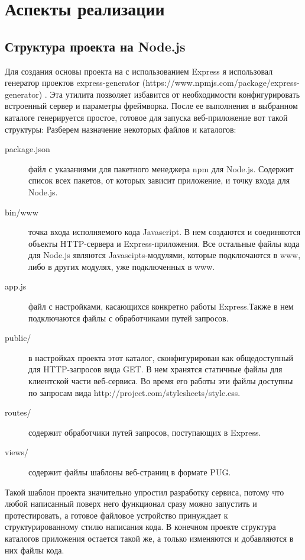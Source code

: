 \section{Аспекты реализации}
\subsection{Структура проекта на Node.js}
\label{subsec:project_structuture}
Для создания основы проекта на с использованием Express я использовал генератор проектов express-generator (https://www.npmjs.com/package/express-generator) . Эта утилита позволяет избавится от необходимости конфигурировать встроенный сервер и параметры фреймворка. После ее выполнения в выбранном каталоге генерируется простое, готовое для запуска  веб-приложение вот такой структуры:
 Разберем назначение некоторых файлов и каталогов:
 \begin{description}
 	\item[package.json] файл с указаниями для пакетного менеджера npm для Node.js. Содержит список всех пакетов, от которых зависит приложение, и точку входа для Node.js.  
 	\item[bin/www] точка входа исполняемого кода Javascript. В нем создаются и соединяются объекты HTTP-сервера и Express-приложения. Все остальные файлы кода для Node.js являются Javascipts-модулями, которые подключаются в www, либо в других модулях, уже подключенных в www.
 	\item[app.js] файл с настройками, касающихся конкретно работы Express.Также в нем подключаются файлы с обработчиками путей запросов.   
 	\item[public/] в настройках проекта этот каталог, сконфигурирован как общедоступный для  HTTP-запросов вида GET. В нем хранятся статичные файлы для клиентской части веб-сервиса. Во время его работы эти файлы доступны по запросам вида http://project.com/stylesheets/style.css.
 	\item[routes/]   содержит обработчики путей запросов, поступающих в Express.
 	\item[views/]   содержит файлы шаблоны веб-страниц в формате PUG.  
 \end{description}


Такой шаблон проекта значительно упростил разработку сервиса, потому что любой написанный поверх него функционал сразу можно запустить и протестировать, а готовое файловое устройство принуждает к структурированному стилю написания кода. В конечном проекте структура каталогов приложения остается такой же, а только изменяются и добавляются в них файлы кода.      
